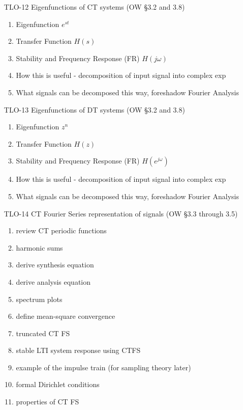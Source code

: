 \begin{enumerate}
\item[TLO-12] Eigenfunctions of CT systems (OW \S 3.2 and 3.8)
  \begin{enumerate}
  \item Eigenfunction $e^{st}$
  \item Transfer Function $H(s)$
  \item Stability and Frequency Response (FR)  $H(j\omega)$
  \item How this is useful - decomposition of input signal into complex exp
  \item What signals can be decomposed this way, foreshadow Fourier Analysis
  \end{enumerate}
  
\item[TLO-13] Eigenfunctions of DT systems (OW \S 3.2 and 3.8)
  \begin{enumerate}
  \item Eigenfunction $z^{n}$
  \item Transfer Function $H(z)$
  \item Stability and Frequency Response (FR) $H\left(e^{j\omega}\right)$
  \item How this is useful - decomposition of input signal into complex exp
  \item What signals can be decomposed this way, foreshadow Fourier Analysis
  \end{enumerate}
  
\item[TLO-14] CT Fourier Series representation of signals (OW \S 3.3 through 3.5)
  \begin{enumerate}
  \item review CT periodic functions
  \item harmonic sums
  \item derive synthesis equation
  \item derive analysis equation
  \item spectrum plots
  \item define mean-square convergence
  \item truncated CT FS
  \item stable LTI system response using CTFS
  \item example of the impulse train (for sampling theory later)
  \item formal Dirichlet conditions
  \item properties of CT FS
  \end{enumerate}


\end{enumerate}
